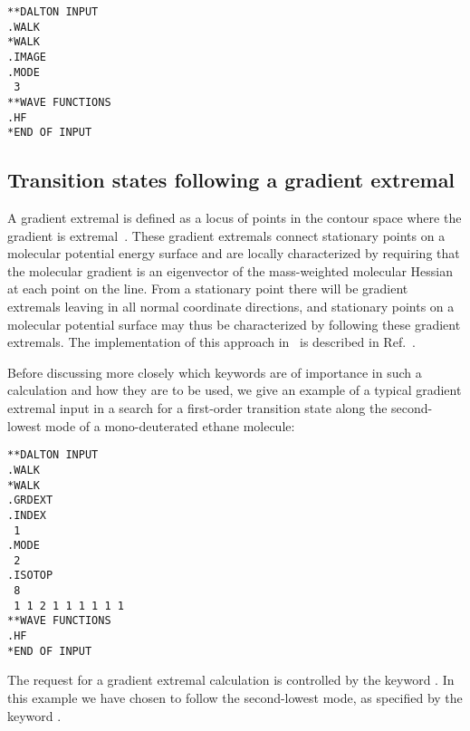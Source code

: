 \begin{verbatim}
**DALTON INPUT
.WALK
*WALK
.IMAGE
.MODE
 3
**WAVE FUNCTIONS
.HF
*END OF INPUT
\end{verbatim}

\subsection{Transition states following a gradient
extremal}\label{sec:gradext}

\begin{center}
\end{center}

A gradient extremal is defined as a locus of points in the contour
space where the gradient is extremal~\cite{pjhjajthtca73}. These
gradient extremals connect
stationary points on a molecular potential energy surface and are
locally characterized by requiring that the molecular gradient is an
eigenvector of the mass-weighted molecular Hessian at each point on
the line. From a stationary point there will be gradient extremals
leaving in all normal coordinate directions, and stationary points
on a molecular potential surface may thus be characterized by
following these gradient extremals. The implementation of this approach
in \siraba\ is described in Ref.~\cite{pjhjajthtca73}.

Before discussing more closely which keywords are of importance in
such a calculation and how they are to be used, we give an example of
a typical gradient extremal input in a search for a first-order
transition state along the second-lowest mode of a mono-deuterated
ethane molecule:

\begin{verbatim}
**DALTON INPUT
.WALK
*WALK
.GRDEXT
.INDEX
 1
.MODE
 2
.ISOTOP
 8
 1 1 2 1 1 1 1 1 1
**WAVE FUNCTIONS
.HF
*END OF INPUT
\end{verbatim}


The request for a gradient extremal
calculation is controlled by the
keyword . In this example we have chosen to follow the
second-lowest mode, as specified by the keyword .

